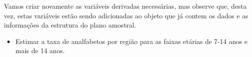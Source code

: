 \documentclass[]{book}
\newenvironment{Shaded}{\begin{snugshade}}{\end{snugshade}}
\newcommand{\KeywordTok}[1]{\textcolor[rgb]{0.13,0.29,0.53}{\textbf{#1}}}
\newcommand{\DataTypeTok}[1]{\textcolor[rgb]{0.13,0.29,0.53}{#1}}
\newcommand{\DecValTok}[1]{\textcolor[rgb]{0.00,0.00,0.81}{#1}}
\newcommand{\StringTok}[1]{\textcolor[rgb]{0.31,0.60,0.02}{#1}}
\newcommand{\OperatorTok}[1]{\textcolor[rgb]{0.81,0.36,0.00}{\textbf{#1}}}
\newcommand{\NormalTok}[1]{#1}
\providecommand{\tightlist}{%
  \setlength{\itemsep}{0pt}\setlength{\parskip}{0pt}}
\theoremstyle{definition}
\theoremstyle{definition}
\theoremstyle{definition}
\theoremstyle{remark}
\begin{document}
Vamos criar novamente as variáveis derivadas necessárias, mas observe
que, desta vez, estas variáveis estão sendo adicionadas ao objeto que já
contem os dados e as informações da estrutura do plano amostral.

\begin{Shaded}
\end{Shaded}

\begin{itemize}
\tightlist
\item
  Estimar a taxa de analfabetos por região para as faixas etárias de
  7-14 anos e mais de 14 anos.
\end{itemize}
\end{document}
